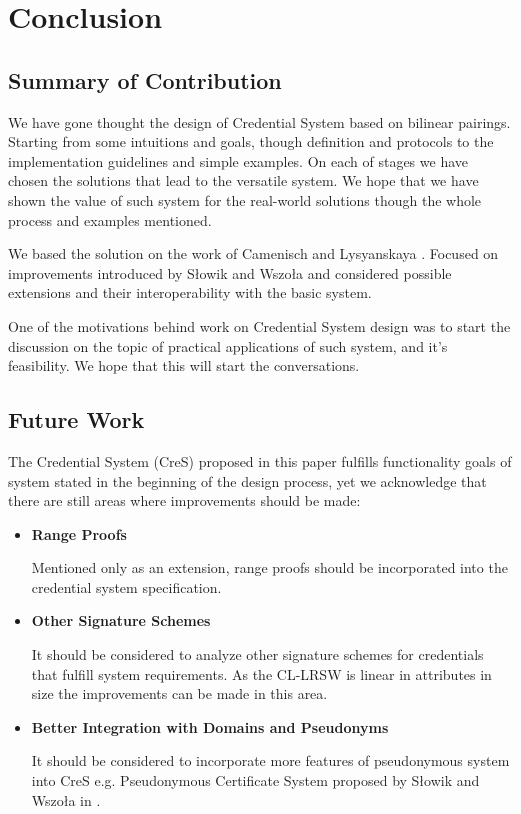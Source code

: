\chapter{Conclusion}
\thispagestyle{chapterBeginStyle}

\section{Summary of Contribution}
We have gone thought the design of Credential System based on bilinear pairings. Starting from some intuitions and goals, though definition and protocols to the implementation guidelines and simple examples. On each of stages we have chosen the solutions that lead to the versatile system. We hope that we have shown the value of such system for the real-world solutions though the whole process and examples mentioned.

We based the solution on the work of Camenisch and Lysyanskaya \cite{anon-creds-cl04, signature-scheme-with-efficient-protocols, pseudonym-systems}. Focused on improvements introduced by Słowik and Wszoła \cite{slowik-efficient-cl-lrsw} and considered possible extensions \cite{complexity-reduction-bobowski, bulletproofs} and their interoperability with the basic system.

One of the motivations behind work on Credential System design was to start the discussion on the topic of practical applications of such system, and it's feasibility. We hope that this will start the conversations.


\section{Future Work}
The Credential System (CreS) proposed in this paper fulfills functionality goals of system stated in the beginning of the design process, yet we acknowledge that there are still areas where improvements should be made:

\begin{itemize}[label=$\circ$]
    \item \textbf{Range Proofs}
    
    Mentioned only as an extension, range proofs should be incorporated into the credential system specification.

    \item \textbf{Other Signature Schemes}
    
    It should be considered to analyze other signature schemes for credentials that fulfill system requirements. As the CL-LRSW is linear in attributes in size the improvements can be made in this area.
    
    \item \textbf{Better Integration with Domains and Pseudonyms}
    
    It should be considered to incorporate more features of pseudonymous system into CreS e.g. Pseudonymous Certificate System proposed by Słowik and Wszoła in \cite{slowik-efficient-cl-lrsw}. 
    
\end{itemize}